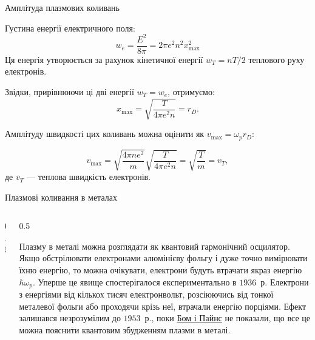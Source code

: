 \documentclass[]{beamer}
\begin{document}
\begin{frame}{Амплітуда плазмових коливань}{}
	\begin{block}{}\justifying\small
		Густина енергії електричного поля:
		\begin{equation*}
			w_e = \frac{E^2}{8\pi} = 2\pi e^2n^2x_{\max}^2
		\end{equation*}
		Ця енергія утворюється за рахунок кінетичної енергії $w_T = nT/2$ теплового руху електронів.

		\medskip

		Звідки, прирівнюючи ці дві енергії $w_T = w_e$, отримуємо:
		\begin{equation*}
			x_{\max} = \sqrt{\frac{T}{4\pi e^2n}} = r_D.
		\end{equation*}

		Амплітуду швидкості цих коливань можна оцінити як $v_{\max} = \omega_p r_D$:

		\begin{equation*}
			v_{\max}  = \sqrt{\frac{4\pi ne^2}{m}} \sqrt{\frac{T}{4\pi e^2n}} = \sqrt{\frac{T}{m}} = v_T,
		\end{equation*}
		де $v_T$ --- теплова швидкість електронів.

	\end{block}
\end{frame}

\begin{frame}{Плазмові коливання в металах}{}
\begin{columns}
	\begin{column}{0.5\linewidth}
        \begin{center}
            
        \end{center}
	\end{column}
	\begin{column}{0.5\linewidth}
         \begin{block}{}\justifying\scriptsize
            Плазму в металі можна розглядати як квантовий гармонічний осцилятор. Якщо обстрілювати електронами алюмінієву фольгу і дуже точно вимірювати їхню енергію, то можна очікувати, електрони будуть втрачати якраз енергію $\hbar\omega_p$. Уперше це явище спостерігалося експериментально в $1936$~р. Електрони з енергіями від кількох тисяч електронвольт, розсіюючись від тонкої металевої фольги або проходячи крізь неї, втрачали енергію порціями. Ефект залишався незрозумілим до $1953$~р., поки \href{https://doi.org/10.1103/PhysRev.92.609}{Бом і Пайнс}  не показали, що все це можна пояснити квантовим збудженням плазми в металі.
         \end{block}
	\end{column}
\end{columns}



\end{frame}
\end{document}
